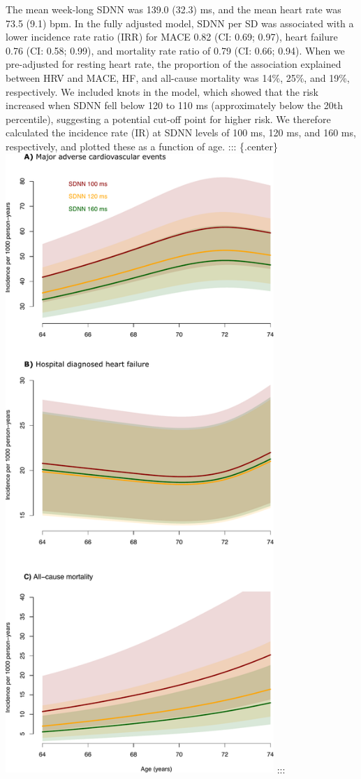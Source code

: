 \documentclass[
  a4paper,
  headsepline=true,
  open=any]{scrbook}
\begin{document}
The mean week-long SDNN was 139.0 (32.3) ms, and the mean heart rate was
73.5 (9.1) bpm. In the fully adjusted model, SDNN per SD was associated
with a lower incidence rate ratio (IRR) for MACE 0.82 (CI: 0.69; 0.97),
heart failure 0.76 (CI: 0.58; 0.99), and mortality rate ratio of 0.79
(CI: 0.66; 0.94). When we pre-adjusted for resting heart rate, the
proportion of the association explained between HRV and MACE, HF, and
all-cause mortality was 14\%, 25\%, and 19\%, respectively. We included
knots in the model, which showed that the risk increased when SDNN fell
below 120 to 110 ms (approximately below the 20th percentile),
suggesting a potential cut-off point for higher risk. We therefore
calculated the incidence rate (IR) at SDNN levels of 100 ms, 120 ms, and
160 ms, respectively, and plotted these as a function of age. :::
\{.center\}
\includegraphics[width=4in,height=\textheight]{images/addition_pro_hrv_ir_mace.pdf}
:::
\end{document}
